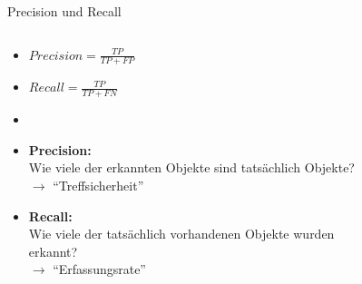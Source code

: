 \documentclass{beamer}
\begin{document}
\begin{frame}{Precision und Recall}
    \begin{columns}
        \begin{column}{0.4\textwidth}
            \begin{itemize}
                \item $Precision = \frac{TP}{TP + FP}$
                \item $Recall = \frac{TP}{TP + FN}$
                \item[]


                \item<4->\textbf{Precision:}\\Wie viele der erkannten Objekte sind tatsächlich Objekte?\\$\rightarrow$ "`Treffsicherheit"'
                \item<5->\textbf{Recall:}\\Wie viele der tatsächlich vorhandenen Objekte wurden erkannt?\\$\rightarrow$ "`Erfassungsrate"'
            \end{itemize}
        \end{column}
        \begin{column}{0.6\textwidth}
            \begin{figure}
                \centering
            \end{figure}
        \end{column}
    \end{columns}
\end{frame}
\end{document}
